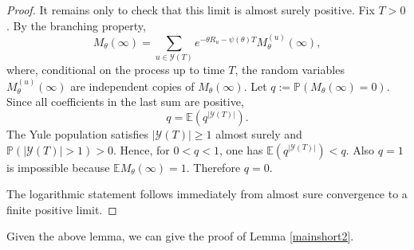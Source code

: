 \documentclass[12pt]{article}
\newcommand{\1}{\textbf{1}}
\def\E{\mathbb{E}}
\def\Pr{\mathbb{P}}
\begin{document}
\begin{proof}
It remains only to check that this limit is almost surely positive.  Fix $T>0$.  By the branching property,
\[
  M_\theta(\infty)
  =\sum_{u\in\mathcal Y(T)} e^{-\theta R_u-\psi(\theta)T}M^{(u)}_\theta(\infty),
\]
where, conditional on the process up to time $T$, the random variables $M^{(u)}_\theta(\infty)$ are independent copies of $M_\theta(\infty)$.  Let $q:=\Pr(M_\theta(\infty)=0)$.  Since all coefficients in the last sum are positive,
\[
  q=\E(q^{|\mathcal Y(T)|}).
\]
The Yule population satisfies $|\mathcal Y(T)|\ge1$ almost surely and $\Pr(|\mathcal Y(T)|>1)>0$.  Hence, for $0<q<1$, one has $\E( q^{|\mathcal Y(T)|})<q$.  Also $q=1$ is impossible because $\E M_\theta(\infty)=1$.  Therefore $q=0$.

The logarithmic statement follows immediately from almost sure convergence to a finite positive limit.
\end{proof}
Given the above lemma, we can give the proof of Lemma \ref{mainshort2}.
\end{document}
